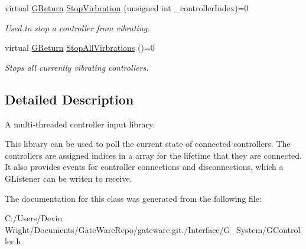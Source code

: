 \begin{DoxyCompactItemize}
\mbox{\label{class_g_w_1_1_s_y_s_t_e_m_1_1_g_controller_a2d1451549619519089a31ab6a075cb09}} 
virtual \mbox{\hyperlink{namespace_g_w_a67a839e3df7ea8a5c5686613a7a3de21}{G\+Return}} \mbox{\hyperlink{class_g_w_1_1_s_y_s_t_e_m_1_1_g_controller_a2d1451549619519089a31ab6a075cb09}{Stop\+Virbration}} (unsigned int \+\_\+controller\+Index)=0
\begin{DoxyCompactList}\small\item\em Used to stop a controller from vibrating. \end{DoxyCompactList}\item 
\mbox{\label{class_g_w_1_1_s_y_s_t_e_m_1_1_g_controller_aea5a523d30ebedb5d9923d61d77f1583}} 
virtual \mbox{\hyperlink{namespace_g_w_a67a839e3df7ea8a5c5686613a7a3de21}{G\+Return}} \mbox{\hyperlink{class_g_w_1_1_s_y_s_t_e_m_1_1_g_controller_aea5a523d30ebedb5d9923d61d77f1583}{Stop\+All\+Virbrations}} ()=0
\begin{DoxyCompactList}\small\item\em Stops all currently vibrating controllers. \end{DoxyCompactList}\end{DoxyCompactItemize}


\subsection{Detailed Description}
A multi-\/threaded controller input library. 

This library can be used to poll the current state of connected controllers. The controllers are assigned indices in a array for the lifetime that they are connected. It also provides events for controller connections and disconnections, which a G\+Listener can be writen to receive. 

The documentation for this class was generated from the following file\+:\begin{DoxyCompactItemize}
\item 
C\+:/\+Users/\+Devin Wright/\+Documents/\+Gate\+Ware\+Repo/gateware.\+git./\+Interface/\+G\+\_\+\+System/G\+Controller.\+h\end{DoxyCompactItemize}

